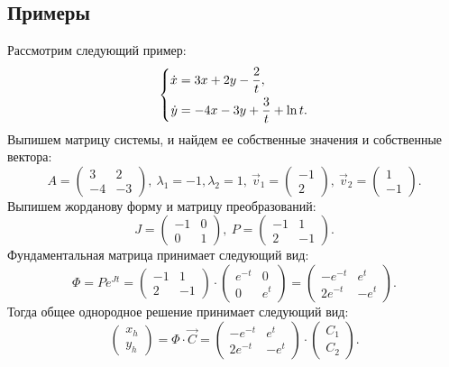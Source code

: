 	\subsection{Примеры}

		Рассмотрим следующий пример:
		\[ \left\lbrace \begin{aligned} \dot{x} &= 3x + 2y - \frac{2}{t}, \\ \dot{y} &= -4x - 3y + \frac{3}{t} + \ln{t}. \end{aligned} \right. \]
		Выпишем матрицу системы, и найдем ее собственные значения и собственные вектора:
		\[ A = \begin{pmatrix} 3 & 2 \\ -4 & -3 \end{pmatrix}, ~ \lambda_1 = -1, \lambda_2 = 1, ~ \vec{v}_1 = \begin{pmatrix} -1 \\ 2 \end{pmatrix}, ~ \vec{v}_2 = \begin{pmatrix} 1 \\ -1 \end{pmatrix}. \]
		Выпишем жорданову форму и матрицу преобразований:
		\[ J = \begin{pmatrix} -1 & 0 \\ 0 & 1 \end{pmatrix}, ~ P = \begin{pmatrix} -1 & 1 \\ 2 & -1 \end{pmatrix}. \]
		Фундаментальная матрица принимает следующий вид:
		\[ \Phi = Pe^{Jt} = \begin{pmatrix} -1 & 1 \\ 2 & -1 \end{pmatrix} \cdot \begin{pmatrix} e^{-t} & 0 \\ 0 & e^{t} \end{pmatrix} = \begin{pmatrix} -e^{-t} & e^{t} \\ 2e^{-t} & -e^{t} \end{pmatrix}. \]
		Тогда общее однородное решение принимает следующий вид:
		\[ \begin{pmatrix} x_{h} \\ y_{h} \end{pmatrix} = \Phi \cdot \vec{C} = \begin{pmatrix} -e^{-t} & e^{t} \\ 2e^{-t} & -e^{t} \end{pmatrix} \cdot \begin{pmatrix} C_1 \\ C_2 \end{pmatrix}. \]
